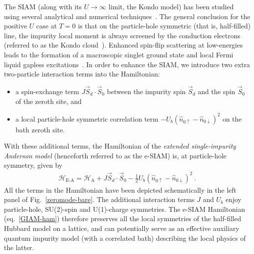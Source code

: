 The SIAM (along with its \(U \to \infty\) limit, the Kondo model) has been studied using several analytical and numerical techniques~\cite{anderson1969exact,anderson1970exact,anderson1970,haldane1978scaling,jefferson_1977,wilson1975,hrk_wilson_1980,andrei_1980,andreiKondoreview,Wiegmann_1981,tsvelickKondoreview,kotliar_1996,Duki_2011,borda_2008,streib_2013,anirban_kondo}. 
The general conclusion for the positive \(U\) case at \(T=0\) is that on the particle-hole symmetric (that is, half-filled) line, the impurity local moment is always screened by the conduction electrons (referred to as the Kondo cloud~\cite{sorensen_erik_affleck_1996,affleck_ian_2001,simon_pascal_2003,martin2010,martin2019,Goldhaber-Gordon1998,Cronenwett1998,Schmid_Weis1998,pustilnik_glazman_2004,Borzenets2020,neel_berndt_2008,Zhao2005}). Enhanced spin-flip scattering at low-energies leads to the formation of a macroscopic singlet ground state and local Fermi liquid gapless excitations~\cite{nozaki2012,mora_2015}.
In order to enhance the SIAM, we introduce two extra two-particle interaction terms into the Hamiltonian:
\begin{itemize}
	\item a spin-exchange term \(J \vec{S}_d\cdot\vec{S}_0\) between the impurity spin \(\vec S_d\) and the spin \(\vec S_0\) of the zeroth site, and 
	\item a local particle-hole symmetric correlation term \(-U_b \left(\hat n_{0 \uparrow} - \hat n_{0 \downarrow}\right)^2\) on the bath zeroth site.
\end{itemize}

With these additional terms, the Hamiltonian of the {\it extended single-impurity Anderson model} (henceforth referred to as the e-SIAM) is, at particle-hole symmetry, given by
\begin{eqnarray}
	\label{GIAM-ham}
	\mathcal{H}_\text{E-A} = \mathcal{H}_\text{A} + J \vec{S}_d\cdot\vec{S}_0 - \frac{1}{2}U_b \left(\hat n_{0 \uparrow} - \hat n_{0 \downarrow}\right)^2~.
\end{eqnarray}
All the terms in the Hamiltonian have been depicted schematically in the left panel of Fig.~\eqref{zeromode-bare}. The additional interaction terms \(J\) and \(U_b\) enjoy particle-hole, SU(2)-spin and U(1)-charge symmetries. The e-SIAM Hamiltonian (eq.~\eqref{GIAM-ham}) therefore preserves all the local symmetries of the half-filled Hubbard model on a lattice, and can potentially serve as an effective auxiliary quantum impurity model (with a correlated bath) describing the local physics of the latter.


